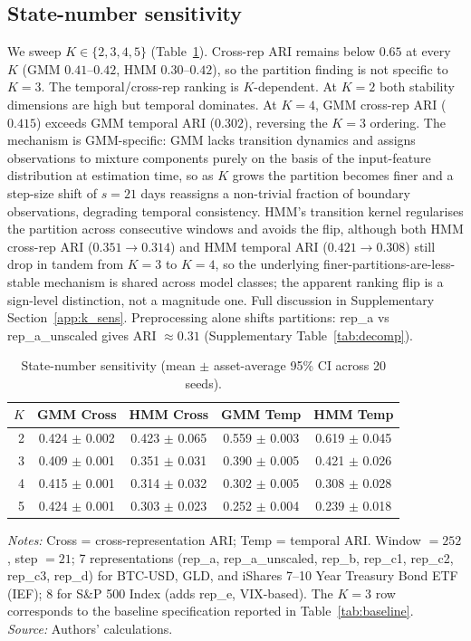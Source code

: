 \documentclass[preprint,12pt,authoryear]{elsarticle}
\newcommand{\SPX}{S\&P 500 Index}
\newcommand{\IEF}{iShares 7--10 Year Treasury Bond ETF (IEF)}
\begin{document}
\subsection{State-number sensitivity}
\label{sec:ksens}

We sweep $K \in \{2,3,4,5\}$ (Table~\ref{tab:robustness}). Cross-rep ARI remains below $0.65$ at every $K$ (GMM $0.41$--$0.42$, HMM $0.30$--$0.42$), so the partition finding is not specific to $K=3$. The temporal/cross-rep ranking is $K$-dependent. At $K=2$ both stability dimensions are high but temporal dominates. At $K=4$, GMM cross-rep ARI ($0.415$) exceeds GMM temporal ARI ($0.302$), reversing the $K=3$ ordering. The mechanism is GMM-specific: GMM lacks transition dynamics and assigns observations to mixture components purely on the basis of the input-feature distribution at estimation time, so as $K$ grows the partition becomes finer and a step-size shift of $s=21$ days reassigns a non-trivial fraction of boundary observations, degrading temporal consistency. HMM's transition kernel regularises the partition across consecutive windows and avoids the flip, although both HMM cross-rep ARI ($0.351 \to 0.314$) and HMM temporal ARI ($0.421 \to 0.308$) still drop in tandem from $K=3$ to $K=4$, so the underlying finer-partitions-are-less-stable mechanism is shared across model classes; the apparent ranking flip is a sign-level distinction, not a magnitude one. Full discussion in Supplementary Section~\ref{app:k_sens}. Preprocessing alone shifts partitions: rep\_a vs rep\_a\_unscaled gives ARI ${\approx}0.31$ (Supplementary Table~\ref{tab:decomp}).

\begin{table}[!htbp]
\centering
\small
\setlength{\tabcolsep}{4pt}
\caption{State-number sensitivity (mean $\pm$ asset-average 95\% CI across 20 seeds).}
\label{tab:robustness}
\begin{tabular}{rcccc}
\toprule
$K$ & GMM Cross & HMM Cross & GMM Temp & HMM Temp \\
\midrule
2 & 0.424 $\pm$ 0.002 & 0.423 $\pm$ 0.065 & 0.559 $\pm$ 0.003 & 0.619 $\pm$ 0.045 \\
3 & 0.409 $\pm$ 0.001 & 0.351 $\pm$ 0.031 & 0.390 $\pm$ 0.005 & 0.421 $\pm$ 0.026 \\
4 & 0.415 $\pm$ 0.001 & 0.314 $\pm$ 0.032 & 0.302 $\pm$ 0.005 & 0.308 $\pm$ 0.028 \\
5 & 0.424 $\pm$ 0.001 & 0.303 $\pm$ 0.023 & 0.252 $\pm$ 0.004 & 0.239 $\pm$ 0.018 \\
\bottomrule
\end{tabular}
\par\medskip
\footnotesize
\parbox{\linewidth}{\textit{Notes:} Cross = cross-representation ARI; Temp = temporal ARI. Window $=252$, step $=21$; 7 representations (rep\_a, rep\_a\_unscaled, rep\_b, rep\_c1, rep\_c2, rep\_c3, rep\_d) for BTC-USD, GLD, and \IEF{}; 8 for \SPX{} (adds rep\_e, VIX-based). The $K=3$ row corresponds to the baseline specification reported in Table~\ref{tab:baseline}.\\
\textit{Source:} Authors' calculations.}
\end{table}
\end{document}
